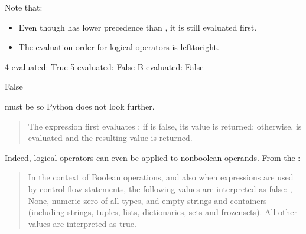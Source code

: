 \documentclass[letterpaper,10pt,english]{sphinxmanual}
\begin{document}
Note that:
\begin{itemize}
\item {} 
Even though  has lower precedence than , it is still evaluated first.

\item {} 
The evaluation order for logical operators is left\sphinxhyphen{}to\sphinxhyphen{}right.

\end{itemize}

\begin{sphinxVerbatim}[commandchars=\\\{\}]
      
\end{sphinxVerbatim}

\begin{sphinxVerbatim}[commandchars=\\\{\}]
4 evaluated: True
5 evaluated: False
B evaluated: False
\end{sphinxVerbatim}

\begin{sphinxVerbatim}[commandchars=\\\{\}]
False
\end{sphinxVerbatim}


 must be  so Python does not look further.
\begin{quote}

The expression  first evaluates ; if  is false, its value is returned; otherwise,  is evaluated and the resulting value is returned.
\end{quote}

Indeed, logical operators can even be applied to non\sphinxhyphen{}boolean operands. From the :
\begin{quote}

In the context of Boolean operations, and also when expressions are used by control flow statements, the following values are interpreted as false: , None, numeric zero of all types, and empty strings and containers (including strings, tuples, lists, dictionaries, sets and frozensets). All other values are interpreted as true.
\end{quote}
\end{document}

